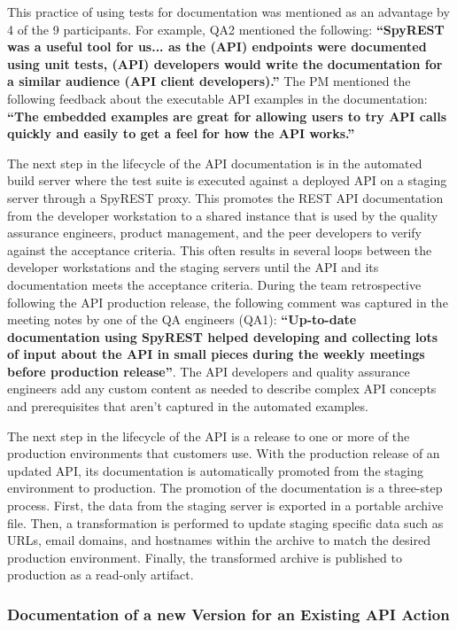 This practice of using tests for documentation was mentioned as an advantage by 4 of the 9 participants. For example, QA2 mentioned the following: \textbf{``SpyREST was a useful tool for us... as the (API) endpoints were documented using unit tests, (API) developers would write the documentation for a similar audience (API client developers).''} The PM mentioned the following feedback about the executable API examples in the documentation: \textbf{``The embedded examples are great for allowing users to try API calls quickly and easily to get a feel for how the API works.''}

The next step in the lifecycle of the API documentation is in the automated build server where the test suite is executed against a deployed API on a staging server through a SpyREST proxy. This promotes the REST API documentation from the developer workstation to a shared instance that is used by the quality assurance engineers, product management, and the peer developers to verify against the acceptance criteria. This often results in several loops between the developer workstations and the staging servers until the API and its documentation meets the acceptance criteria. During the team retrospective following the API production release, the following comment was captured in the meeting notes by one of the QA engineers (QA1):  \textbf{``Up-to-date documentation using SpyREST helped developing and collecting lots of input about the API in small pieces during the weekly meetings before production release''}. The API developers and quality assurance engineers add any custom content as needed to describe complex API concepts and prerequisites that aren't captured in the automated examples.

The next step in the lifecycle of the API is a release to one or more of the production environments that customers use. With the production release of an updated API, its documentation is automatically promoted from the staging environment to production. The promotion of the documentation is a three-step process. First, the data from the staging server is exported in a portable archive file. Then, a transformation is performed to update staging specific data such as URLs, email domains, and hostnames within the archive to match the desired production environment. Finally, the transformed archive is published to production as a read-only artifact.


\subsubsection{Documentation of a new Version for an Existing API Action}

